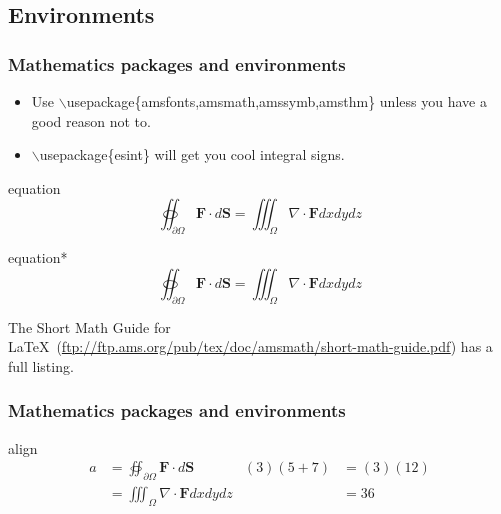 \documentclass[ignorenonframetext]{beamer}
\newcommand{\latexinput}[1]{\lstset{language=[LaTeX]TeX}}
\begin{document}
\subsection{Environments}
\begin{frame}
  \frametitle{Mathematics packages and environments}
  \begin{itemize}
  \item Use $\backslash$usepackage\{amsfonts,amsmath,amssymb,amsthm\}
    unless you have a good reason not to.
  \item $\backslash$usepackage\{esint\} will get you cool integral signs.
  \end{itemize}
  \begin{block}{equation}
    \begin{equation}
      \label{gaussthm}
      \oiint_{\partial\Omega}\mathbf{F}\cdot d\mathbf{S} = \iiint_\Omega\nabla\cdot\mathbf{F}dxdydz
    \end{equation}
  \end{block}
  \begin{block}{equation*}
    \begin{equation*}
      \oiint_{\partial\Omega}\mathbf{F}\cdot d\mathbf{S} = \iiint_\Omega\nabla\cdot\mathbf{F}dxdydz
    \end{equation*}
  \end{block}
  {\small The Short Math Guide for
  \LaTeX\ (\url{ftp://ftp.ams.org/pub/tex/doc/amsmath/short-math-guide.pdf}) has a
  full listing.}
\end{frame}

\begin{frame}
  \frametitle{Mathematics packages and environments}
  \begin{block}{align}
    \latexinput{code/align.tex}
    \begin{align}
      a &= \oiint_{\partial\Omega}\mathbf{F}\cdot d\mathbf{S}  &  (3)(5 + 7) &= (3)(12)\\
        &= \iiint_\Omega\nabla\cdot\mathbf{F}dxdydz  &  &= 36
    \end{align}
  \end{block}
\end{frame}
\end{document}
